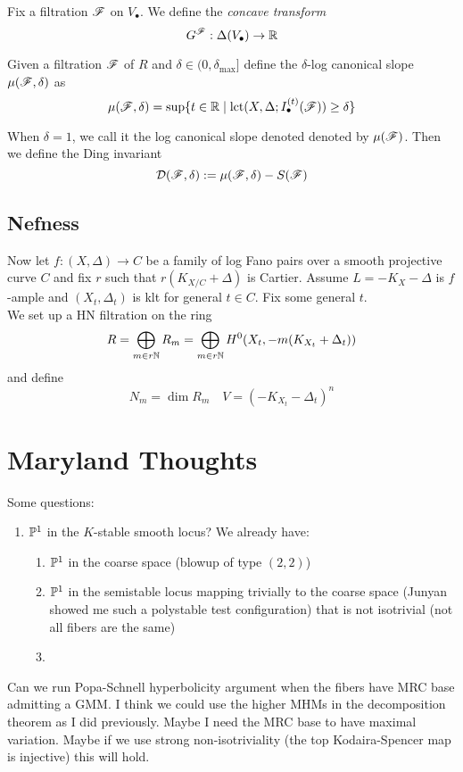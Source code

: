 \documentclass[12pt]{article}
\DeclareMathOperator{\lct}{\mathrm{lct}}
\begin{document}
\begin{defn}
Fix a filtration $\F$ on $V_\bullet$. We define the \textit{concave transform} 
\[ G^{\F} : \Delta(V_\bullet) \to \RR \]
\end{defn}

\begin{defn}
Given a filtration $\F$ of $R$ and $\delta \in (0, \delta_{\max}]$ define the $\delta$-log canonical slope $\mu(\F, \delta)$ as
\[ \mu(\F, \delta) = \sup \{ t \in \RR \mid \lct(X, \Delta; I_\bullet^{(t)}(\F)) \ge \delta \} \]
\end{defn}
When $\delta = 1$, we call it the log canonical slope denoted denoted by $\mu(\F)$. Then we define the Ding invariant
\[ \D(\F, \delta) := \mu(\F, \delta) - S(\F) \]


\subsection{Nefness}

Now let $f : (X, \Delta) \to C$ be a family of log Fano pairs over a smooth projective curve $C$ and fix $r$ such that $r(K_{X/C} + \Delta)$ is Cartier. Assume $L = -K_X - \Delta$ is $f$-ample and $(X_t, \Delta_t)$ is klt for general $t \in C$. Fix some general $t$. 
\bigskip\\
We set up a HN filtration on the ring
\[ R = \bigoplus_{m \in r \N} R_m = \bigoplus_{m \in r \N} H^0(X_t, -m(K_{X_t} + \Delta_t)) \]
and define
\[ N_m = \dim{R_m} \quad V = (-K_{X_t} - \Delta_t)^n \]


\section{Maryland Thoughts}

Some questions:
\begin{enumerate}
\item $\P^1$ in the $K$-stable smooth locus? We already have:
\begin{enumerate}
\item $\P^1$ in the coarse space (blowup of type $(2,2)$)
\item $\P^1$ in the semistable locus mapping trivially to the coarse space (Junyan showed me such a polystable test configuration) that is not isotrivial (not all fibers are the same)
\item 
\end{enumerate}
\end{enumerate}

Can we run Popa-Schnell hyperbolicity argument when the fibers have MRC base admitting a GMM. I think we could use the higher MHMs in the decomposition theorem as I did previously. Maybe I need the MRC base to have maximal variation. Maybe if we use strong non-isotriviality (the top Kodaira-Spencer map is injective) this will hold.
\end{document}
